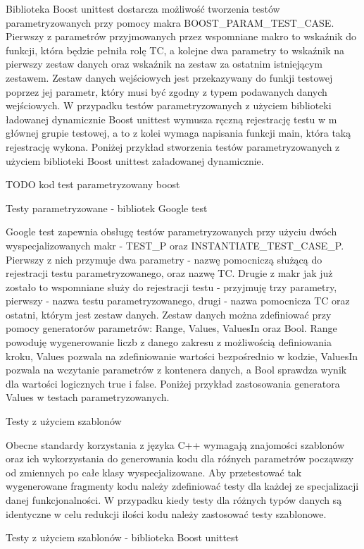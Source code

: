 Biblioteka Boost unittest dostarcza możliwość tworzenia testów parametryzowanych przy pomocy makra BOOST_PARAM_TEST_CASE.
Pierwszy z parametrów przyjmowanych przez wspomniane makro to wskaźnik do funkcji, która będzie pełniła rolę TC, a kolejne dwa parametry to wskaźnik na pierwszy zestaw danych oraz wskaźnik na zestaw za ostatnim istniejącym zestawem.
Zestaw danych wejściowych jest przekazywany do funkji testowej poprzez jej parametr, który musi być zgodny z typem podawanych danych wejściowych.
W przypadku testów parametryzowanych z użyciem biblioteki ładowanej dynamicznie Boost unittest wymusza ręczną rejestrację testu w m głównej grupie testowej, a to z kolei wymaga napisania funkcji main, która taką rejestrację wykona.
Poniżej przykład stworzenia testów parametryzowanych z użyciem biblioteki Boost unittest załadowanej dynamicznie.

TODO kod test parametryzowany boost

Testy parametryzowane - bibliotek Google test

Google test zapewnia obsługę testów parametryzowanych przy użyciu dwóch wyspecjalizowanych makr - TEST_P oraz INSTANTIATE_TEST_CASE_P.
Pierwszy z nich przymuje dwa parametry - nazwę pomocniczą służącą do rejestracji testu parametryzowanego, oraz nazwę TC. Drugie z makr jak już zostało to wspomniane służy do rejestracji testu  - przyjmuję trzy parametry, pierwszy - nazwa testu parametryzowanego, drugi - nazwa pomocnicza TC oraz ostatni, którym jest zestaw danych.
Zestaw danych można zdefiniować przy pomocy generatorów parametrów: Range, Values, ValuesIn oraz Bool. Range powoduję wygenerowanie liczb z danego zakresu z możliwością definiowania kroku, Values pozwala na zdefiniowanie wartości bezpośrednio w kodzie, ValuesIn pozwala na wczytanie parametrów z kontenera danych, a Bool sprawdza wynik dla wartości logicznych true i false.
Poniżej przykład zastosowania generatora Values w testach parametryzowanych.

Testy z użyciem szablonów

Obecne standardy korzystania z języka C++ wymagają znajomości szablonów oraz ich wykorzystania do generowania kodu dla róźnych parametrów począwszy od zmiennych po całe klasy wyspecjalizowane. Aby przetestować tak wygenerowane fragmenty kodu należy zdefiniować testy dla każdej ze specjalizacji danej funkcjonalności.
W przypadku kiedy testy dla różnych typów danych są identyczne w celu redukcji ilości kodu należy zastosować testy szablonowe.

Testy z użyciem szablonów - biblioteka Boost unittest


